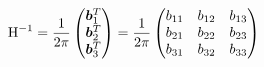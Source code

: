 \documentclass[11pt,a4paper,uplatex]{jsarticle}
\begin{document}
\begin{align}
    {\rm H}^{-1} &= \frac{1}{2\pi} \begin{pmatrix} \bm{b}_{1}^{T} \\ \bm{b}_{2}^{T} \\ \bm{b}_{3}^{T} \end{pmatrix} 
        = \frac{1}{2\pi}\begin{pmatrix} 
            b_{11} & b_{12} & b_{13} \\
            b_{21} & b_{22} & b_{23} \\
            b_{31} & b_{32} & b_{33} \\
        \end{pmatrix} \\
\end{align}


%
\end{document}
